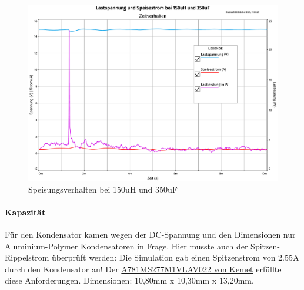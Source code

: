 \begin{figure}[H]
	\centering
	\includegraphics[width=\textwidth*6/8]{pictures/2LoadsParallel_Lastspannung und Speisestrom bei 150uH und 350uF.pdf}
	\caption{Speisungsverhalten bei 150uH und 350uF}
	\label{pic:simulation_150uH_350uF}
\end{figure}
\paragraph{Kapazität}Für den Kondensator kamen wegen der DC-Spannung und den Dimensionen nur Aluminium-Polymer Kondensatoren in Frage. Hier musste auch der Spitzen-Rippelstrom überprüft werden: Die Simulation gab einen Spitzenstrom von 2.55A durch den Kondensator an! Der \href{https://www.digikey.ch/de/products/detail/kemet/A781MS277M1VLAV022/16679281?s=N4IgTCBcDaIIIHYAcBGAsgZTAhaUDUAZOfABjAgF0BfIA}{A781MS277M1VLAV022 von Kemet} erfüllte diese Anforderungen. Dimensionen: 10,80mm x 10,30mm x 13,20mm.
